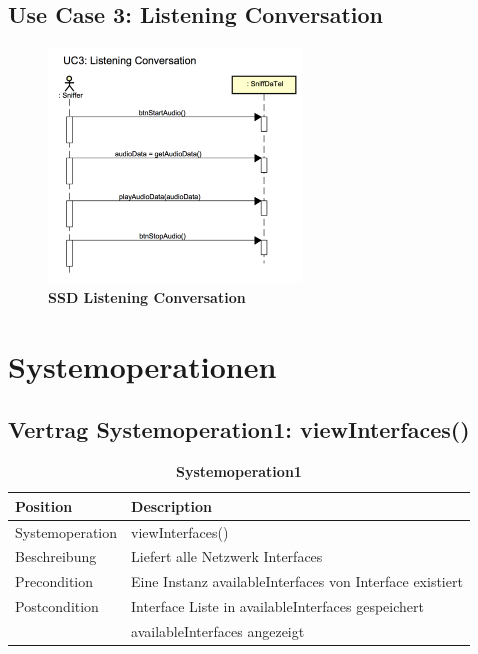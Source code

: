 \documentclass[a4,12pt]{scrartcl}
\begin{document}
\subsection{Use Case 3: Listening Conversation}
\begin{figure} [H]
	\begin{center}
	\includegraphics[width=0.60\textwidth]{./figures/UC3.png}
	\caption{\textbf{SSD Listening Conversation}}
	\label{Bild Referenz}
	\end{center}
\end{figure}

\section{Systemoperationen}
\subsection{Vertrag Systemoperation1: viewInterfaces()}
\begin{table}[H]
\centering
    \begin{tabular}{@{} l l@{}}    
    {Position} & {Description}\\ \midrule
   	Systemoperation & viewInterfaces()\\ \addlinespace
   	Beschreibung & Liefert alle Netzwerk Interfaces\\ \addlinespace
   	Precondition & Eine Instanz availableInterfaces von Interface existiert\\ \addlinespace
	Postcondition & Interface Liste in availableInterfaces gespeichert\\ \addlinespace
	& availableInterfaces angezeigt\\ \bottomrule
    \end{tabular}
\caption{\textbf{Systemoperation1}}
\end{table}
\end{document}
